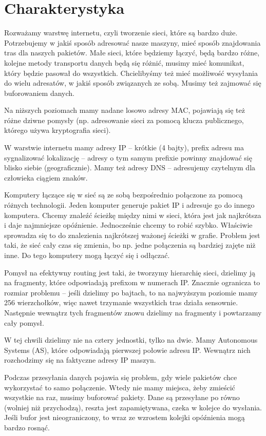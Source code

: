 \section{Charakterystyka}
Rozważamy warstwę internetu, czyli tworzenie sieci, które są bardzo duże. Potrzebujemy w jakiś sposób adresować nasze maszyny, mieć sposób znajdowania tras dla naszych pakietów. Małe sieci, które będziemy łączyć, będą bardzo różne, kolejne metody transportu danych będą się różnić, musimy mieć komunikat, który będzie pasował do wszystkich. Chcielibyśmy też mieć możliwość wysyłania do wielu adresatów, w jakiś sposób związanych ze sobą. Musimy też zajmować się buforowaniem danych.

Na niższych poziomach mamy nadane losowo adresy MAC, pojawiają się też różne dziwne pomysły (np. adresowanie sieci za pomocą klucza publicznego, którego używa kryptografia sieci).

W warstwie internetu mamy adresy IP -- krótkie (4 bajty), prefix adresu ma sygnalizować lokalizację -- adresy o tym samym prefixie powinny znajdować się blisko siebie (geograficznie). Mamy też adresy DNS -- adresujemy czytelnym dla człowieka ciągiem znaków.

Komputery łączące się w sieć są ze sobą bezpośrednio połączone za pomocą różnych technologii. Jeden komputer generuje pakiet IP i adresuje go do innego komputera. Chcemy znaleźć ścieżkę między nimi w sieci, która jest jak najkrótsza i daje najmniejsze opóźnienie. Jednocześnie chcemy to robić szybko. Właściwie sprowadza się to do znalezienia najkrótszej ważonej ścieżki w grafie. Problem jest taki, że sieć cały czas się zmienia, bo np. jedne połączenia są bardziej zajęte niż inne. Do tego komputery mogą łączyć się i odłączać.

Pomysł na efektywny routing jest taki, że tworzymy hierarchię sieci, dzielimy ją na fragmenty, które odpowiadają prefixom w numerach IP. Znacznie ogranicza to rozmiar problemu -- jeśli dzielimy po bajtach, to na najwyższym poziomie mamy 256 wierzchołków, więc nawet trzymanie wszystkich tras działa sensownie. Następnie wewnątrz tych fragmentów znowu dzielimy na fragmenty i powtarzamy cały pomysł.

W tej chwili dzielimy nie na cztery jednostki, tylko na dwie. Mamy Autonomous Systems (AS), które odpowiadają pierwszej połowie adresu IP. Wewnątrz nich rozchodzimy się na faktyczne adresy IP maszyn.

Podczas przesyłania danych pojawia się problem, gdy wiele pakietów chce wykorzystać to samo połączenie. Wtedy nie mamy miejsca, żeby zmieścić wszystkie na raz, musimy buforować pakiety. Dane są przesyłane po równo (wolniej niż przychodzą), reszta jest zapamiętywana, czeka w kolejce do wysłania. Jeśli bufor jest nieograniczony, to wraz ze wzrostem kolejki opóźnienia mogą bardzo rosnąć.

